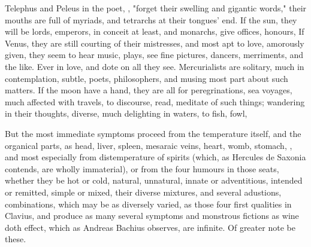 {Telephus and Peleus in the poet, , "forget their swelling and gigantic words," their mouths
are full of myriads, and tetrarchs at their tongues' end. If the sun, they will
be lords, emperors, in conceit at least, and monarchs, give offices, honours,
\etc{} If Venus, they are still courting of their mistresses, and most apt to
love, amorously given, they seem to hear music, plays, see fine pictures,
dancers, merriments, and the like. Ever in love, and dote on all they see.
Mercurialists are solitary, much in contemplation, subtle, poets, philosophers,
and musing most part about such matters. If the moon have a hand, they are all
for peregrinations, sea voyages, much affected with travels, to discourse,
read, meditate of such things; wandering in their thoughts, diverse, much
delighting in waters, to fish, fowl, \etc{}

But the most immediate symptoms proceed from the temperature itself, and the
organical parts, as head, liver, spleen, mesaraic veins, heart, womb, stomach,
\etc{}, and most especially from distemperature of spirits (which, as
Hercules de Saxonia contends, are wholly immaterial), or
from the four humours in those seats, whether they be hot or cold, natural,
unnatural, innate or adventitious, intended or remitted, simple or mixed, their
diverse mixtures, and several adustions, combinations, which may be as
diversely varied, as those four first qualities in
Clavius, and produce as many several symptoms and
monstrous fictions as wine doth effect, which as Andreas Bachius observes,
 are infinite. Of greater note
be these.

}
